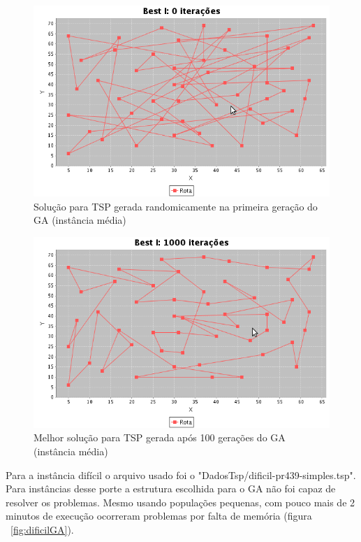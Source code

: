 \documentclass{acm_proc_article-sp}
\begin{document}
\begin{figure}[ht]
 \begin{center}
  \includegraphics[scale=0.4]{imagens/medio_GA1.png} 
  \caption{Solução para TSP gerada randomicamente na primeira geração do GA (instância média)}
  \label{fig:medioGA1}
 \end{center}
\end{figure}

\begin{figure}[ht]
 \begin{center}
  \includegraphics[scale=0.4]{imagens/medio_GA2.png} 
  \caption{Melhor solução para TSP gerada após 100 gerações do GA (instância média)}
  \label{fig:medioGA2}
 \end{center}
\end{figure}


Para a instância difícil o arquivo usado foi o "DadosTsp/dificil-pr439-simples.tsp". Para instâncias desse porte a estrutura escolhida para o GA não foi capaz de resolver os problemas. Mesmo usando populações pequenas, com pouco mais de 2 minutos de execução ocorreram problemas por falta de memória (figura ~\ref{fig:dificilGA}).
\end{document}
